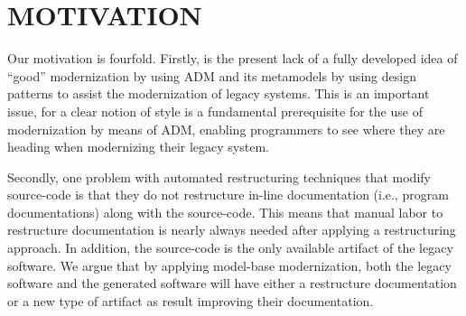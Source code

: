 \documentclass[a4paper,twoside]{article}
\begin{document}
\section{\uppercase{Motivation}}

\noindent Our motivation is fourfold. Firstly, is the present lack of a fully developed idea of ``good'' modernization by using ADM and its metamodels by using design patterns to assist the modernization of legacy systems. This is an important issue, for a clear notion of style is a fundamental prerequisite for the use of modernization by means of ADM, enabling programmers to see where they are heading when modernizing their legacy system. 




Secondly, one problem with automated restructuring techniques that modify source-code is that they do not restructure in-line documentation (i.e., program documentations) along with the source-code. This means that manual labor to restructure documentation is nearly always needed after applying a restructuring approach. In addition, the source-code is the only available artifact of the legacy software. We argue that by applying model-base modernization, both the legacy software and the generated software will have either a restructure documentation or a new type of artifact as result improving their documentation.

\end{document}
